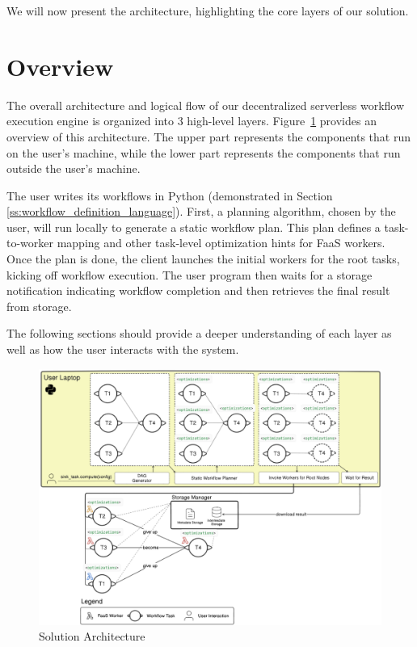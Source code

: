 We will now present the architecture, highlighting the core layers of our solution.

\section{Overview}
The overall architecture and logical flow of our decentralized serverless workflow execution engine is organized into 3 high-level layers. Figure~\ref{fig:solution_architecture} provides an overview of this architecture. The upper part represents the components that run on the user's machine, while the lower part represents the components that run outside the user's machine. 

The user writes its workflows in Python (demonstrated in Section \ref{ss:workflow_definition_language}). First, a planning algorithm, chosen by the user, will run locally to generate a static workflow plan. This plan defines a task-to-worker mapping and other task-level optimization hints for FaaS workers. Once the plan is done, the client launches the initial workers for the root tasks, kicking off workflow execution. The user program then waits for a storage notification indicating workflow completion and then retrieves the final result from storage.

The following sections should provide a deeper understanding of each layer as well as how the user interacts with the system.

\begin{figure}[h]
  \centering
  \includegraphics[width=\columnwidth]{Images/mine/solution_distributedarchintegrated.png}
  \caption{Solution Architecture}
  \label{fig:solution_architecture}
\end{figure}


